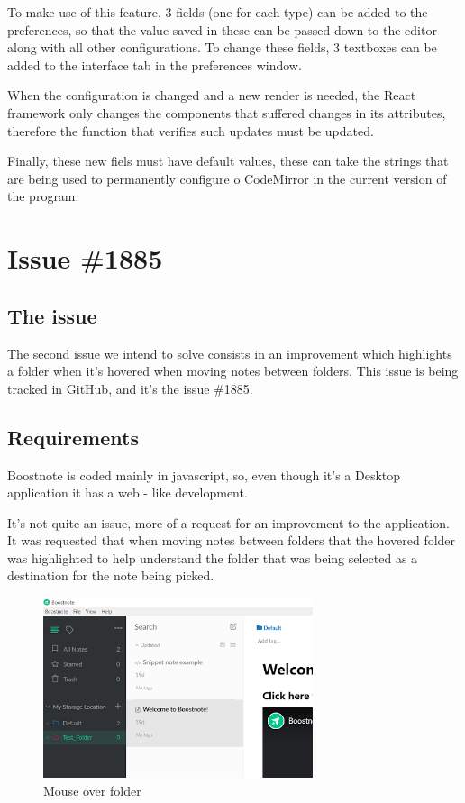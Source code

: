 To make use of this feature, 3 fields (one for each type) can be added
to the preferences, so that the value saved in these can be passed down
to the editor along with all other configurations. To change these
fields, 3 textboxes can be added to the interface tab in the preferences
window.

When the configuration is changed and a new render is needed, the React
framework only changes the components that suffered changes in its
attributes, therefore the function that verifies such updates must be
updated.

Finally, these new fiels must have default values, these can take the
strings that are being used to permanently configure o CodeMirror in the
current version of the program. 

\section{Issue \#1885}\label{issue-1885}

\subsection{The issue}\label{the-issue-1}

The second issue we intend to solve consists in an improvement which
highlights a folder when it's hovered when moving notes between folders.
This issue is being tracked in GitHub, and it's the issue \#1885.

\subsection{Requirements}\label{requirements-1}

Boostnote is coded mainly in javascript, so, even though it's a Desktop
application it has a web - like development.

It's not quite an issue, more of a request for an improvement to the
application. It was requested that when moving notes between folders
that the hovered folder was highlighted to help understand the folder
that was being selected as a destination for the note being picked.

\begin{figure}
\centering
\includegraphics[height=2.08333in]{../hoveredWithMouseEx.png}
\caption{Mouse over folder}
\end{figure}

